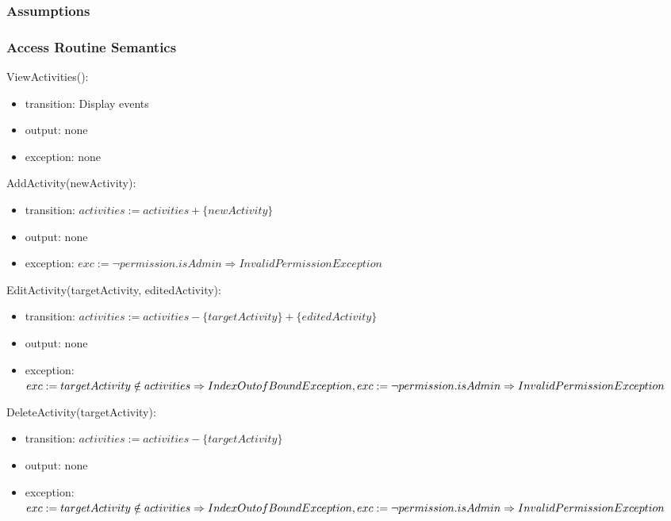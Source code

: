 \documentclass[12pt, titlepage]{article}
\begin{document}
\subsubsection{Assumptions}

\subsubsection{Access Routine Semantics}

\noindent ViewActivities():
\begin{itemize}
\item transition: Display events
\item output: none
\item exception: none
\end{itemize}

\noindent AddActivity(newActivity):
\begin{itemize}
\item transition: $activities := activities + \{newActivity\}$
\item output: none
\item exception: $exc := \neg permission.isAdmin \Rightarrow InvalidPermission Exception$
\end{itemize}

\noindent EditActivity(targetActivity, editedActivity):
\begin{itemize}
\item transition: $activities := activities - \{targetActivity\} + \{editedActivity\}$
\item output: none
\item exception: $exc := targetActivity \notin activities \Rightarrow IndexOutofBound Exception,\\ 
                  exc := \neg permission.isAdmin \Rightarrow InvalidPermission Exception$
\end{itemize}

\noindent DeleteActivity(targetActivity):
\begin{itemize}
\item transition: $activities := activities - \{targetActivity\}$
\item output: none
\item exception: $exc := targetActivity \notin activities \Rightarrow IndexOutofBound Exception,\\
                  exc := \neg permission.isAdmin \Rightarrow InvalidPermission Exception$
\end{itemize}
\end{document}
